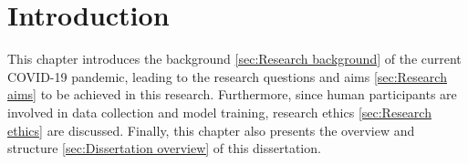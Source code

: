 \chapter{Introduction}
\label{chap:Introduction}
This chapter introduces the background \ref{sec:Research background} of the current COVID-19 pandemic, leading to the research questions and aims \ref{sec:Research aims} to be achieved in this research.
Furthermore, since human participants are involved in data collection and model training, research ethics \ref{sec:Research ethics} are discussed. Finally, this chapter also presents the overview and structure \ref{sec:Dissertation overview} of this dissertation.



